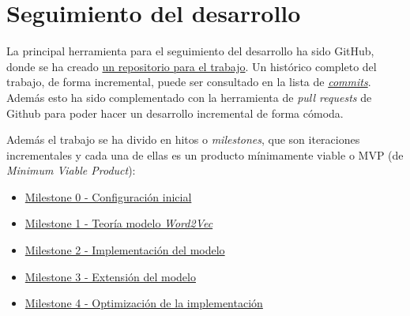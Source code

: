 \section{Seguimiento del desarrollo}

La principal herramienta para el seguimiento del desarrollo ha sido GitHub, donde se ha creado \href{https://github.com/antoniogamiz/tfg}{un repositorio para el trabajo}.
Un histórico completo del trabajo, de forma incremental, puede ser consultado en la lista de \href{https://github.com/antoniogamiz/tfg/commits/main}{\textit{commits}}.
Además esto ha sido complementado con la herramienta de \textit{pull requests} de Github para poder hacer un desarrollo incremental de forma cómoda.

Además el trabajo se ha divido en hitos o \textit{milestones}, que son iteraciones incrementales y cada una de ellas es un producto mínimamente viable o MVP
(de \textit{Minimum Viable Product}):

\begin{itemize}
      \item \href{https://github.com/antoniogamiz/tfg/milestone/1}{Milestone 0 - Configuración inicial}
      \item \href{https://github.com/antoniogamiz/tfg/milestone/4}{Milestone 1 - Teoría modelo \textit{Word2Vec}}
      \item \href{https://github.com/antoniogamiz/tfg/milestone/6}{Milestone 2 - Implementación del modelo}
      \item \href{https://github.com/antoniogamiz/tfg/milestone/7}{Milestone 3 - Extensión del modelo}
      \item \href{https://github.com/antoniogamiz/tfg/milestone/8}{Milestone 4 - Optimización de la implementación}
\end{itemize}
